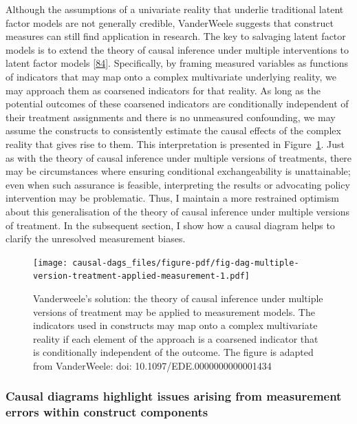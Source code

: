 \documentclass[
  singlecolumn]{article}
\begin{document}
Although the assumptions of a univariate reality that underlie
traditional latent factor models are not generally credible, VanderWeele
suggests that construct measures can still find application in research.
The key to salvaging latent factor models is to extend the theory of
causal inference under multiple interventions to latent factor models
{[}\protect\hyperlink{ref-vanderweele2022}{84}{]}. Specifically, by
framing measured variables as functions of indicators that may map onto
a complex multivariate underlying reality, we may approach them as
coarsened indicators for that reality. As long as the potential outcomes
of these coarsened indicators are conditionally independent of their
treatment assignments and there is no unmeasured confounding, we may
assume the constructs to consistently estimate the causal effects of the
complex reality that gives rise to them. This interpretation is
presented in
Figure~\ref{fig-dag-multiple-version-treatment-applied-measurement}.
Just as with the theory of causal inference under multiple versions of
treatments, there may be circumstances where ensuring conditional
exchangeability is unattainable; even when such assurance is feasible,
interpreting the results or advocating policy intervention may be
problematic. Thus, I maintain a more restrained optimism about this
generalisation of the theory of causal inference under multiple versions
of treatment. In the subsequent section, I show how a causal diagram
helps to clarify the unresolved measurement biases.

\begin{figure}

{\centering \texttt{[image: causal-dags\_files/figure-pdf/fig-dag-multiple-version-treatment-applied-measurement-1.pdf]}

}

\caption{\label{fig-dag-multiple-version-treatment-applied-measurement}Vanderweele's
solution: the theory of causal inference under multiple versions of
treatment may be applied to measurement models. The indicators used in
constructs may map onto a complex multivariate reality if each element
of the approach is a coarsened indicator that is conditionally
independent of the outcome. The figure is adapted from VanderWeele: doi:
10.1097/EDE.0000000000001434}

\end{figure}

\hypertarget{causal-diagrams-highlight-issues-arising-from-measurement-errors-within-construct-components}{%
\subsubsection{Causal diagrams highlight issues arising from measurement
errors within construct
components}\label{causal-diagrams-highlight-issues-arising-from-measurement-errors-within-construct-components}}
\end{document}
